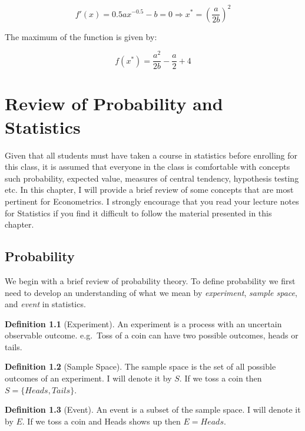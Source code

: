 \documentclass[
]{book}
\theoremstyle{definition}
\newtheorem{definition}{Definition}[chapter]
\theoremstyle{definition}
\theoremstyle{definition}
\theoremstyle{definition}
\theoremstyle{remark}
\begin{document}
\[f'(x)= 0.5ax^{-0.5}-b=0 \Rightarrow x^*=\left(\frac{a}{2b}\right )^2\]

The maximum of the function is given by:

\[f(x^*) = \frac{a^2}{2b}-\frac{a}{2}+4\]

\hypertarget{review-of-probability-and-statistics}{%
\chapter{Review of Probability and Statistics}\label{review-of-probability-and-statistics}}

Given that all students must have taken a course in statistics before enrolling for this class, it is assumed that everyone in the class is comfortable with concepts such probability, expected value, measures of central tendency, hypothesis testing etc. In this chapter, I will provide a brief review of some concepts that are most pertinent for Econometrics. I strongly encourage that you read your lecture notes for Statistics if you find it difficult to follow the material presented in this chapter.

\hypertarget{probability}{%
\section{Probability}\label{probability}}

We begin with a brief review of probability theory. To define probability we first need to develop an understanding of what we mean by \emph{experiment}, \emph{sample space}, and \emph{event} in statistics.

\begin{definition}[Experiment]
\protect\hypertarget{def:unnamed-chunk-66}{}\label{def:unnamed-chunk-66}An experiment is a process with an uncertain observable outcome. e.g.~Toss of a coin can have two possible outcomes, heads or tails.
\end{definition}

\begin{definition}[Sample Space]
\protect\hypertarget{def:unnamed-chunk-67}{}\label{def:unnamed-chunk-67}The sample space is the set of all possible outcomes of an experiment. I will denote it by \(S\). If we toss a coin then \(S=\{Heads,Tails\}\).
\end{definition}

\begin{definition}[Event]
\protect\hypertarget{def:unnamed-chunk-68}{}\label{def:unnamed-chunk-68}An event is a subset of the sample space. I will denote it by \(E\). If we toss a coin and Heads shows up then \(E={Heads}\).
\end{definition}
\end{document}
